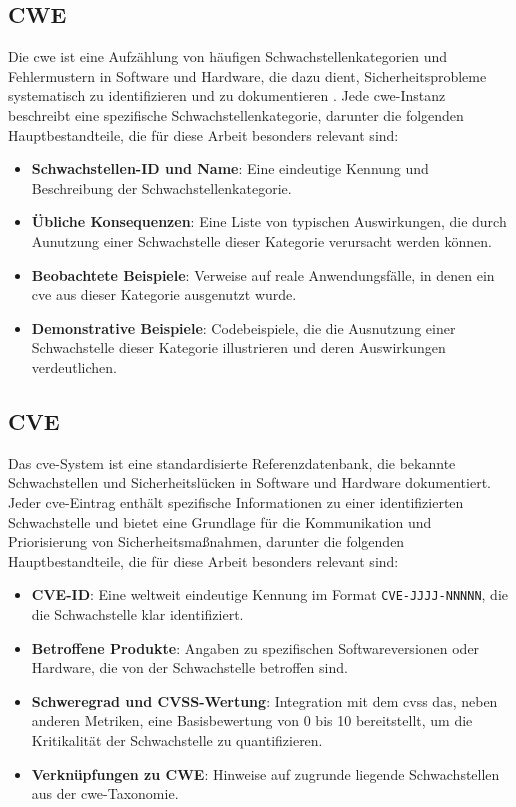 \subsection{CWE}
\label{bg:cwe}
Die \gls{cwe} ist eine Aufzählung von häufigen Schwachstellenkategorien und Fehlermustern in Software und Hardware, die dazu dient, Sicherheitsprobleme systematisch zu identifizieren und zu dokumentieren \autocite{CWEWebsite}. Jede \gls{cwe}-Instanz beschreibt eine spezifische Schwachstellenkategorie, darunter die folgenden Hauptbestandteile, die für diese Arbeit besonders relevant sind:

\begin{itemize}
    \item \textbf{Schwachstellen-ID und Name}: Eine eindeutige Kennung und Beschreibung der Schwachstellenkategorie.
    \item \textbf{Übliche Konsequenzen}: Eine Liste von typischen Auswirkungen, die durch Aunutzung einer Schwachstelle dieser Kategorie verursacht werden können.
    \item \textbf{Beobachtete Beispiele}: Verweise auf reale Anwendungsfälle, in denen ein \gls{cve} aus dieser Kategorie ausgenutzt wurde.
    \item \textbf{Demonstrative Beispiele}: Codebeispiele, die die Ausnutzung einer Schwachstelle dieser Kategorie illustrieren und deren Auswirkungen verdeutlichen.
\end{itemize}

\subsection{CVE}
\label{bg:cve}
Das \gls{cve}-System ist eine standardisierte Referenzdatenbank, die bekannte Schwachstellen und Sicherheitslücken in Software und Hardware dokumentiert. Jeder \gls{cve}-Eintrag enthält spezifische Informationen zu einer identifizierten Schwachstelle und bietet eine Grundlage für die Kommunikation und Priorisierung von Sicherheitsmaßnahmen, darunter die folgenden Hauptbestandteile, die für diese Arbeit besonders relevant sind:

\begin{itemize}
    \item \textbf{CVE-ID}: Eine weltweit eindeutige Kennung im Format \texttt{CVE-JJJJ-NNNNN}, die die Schwachstelle klar identifiziert.
    \item \textbf{Betroffene Produkte}: Angaben zu spezifischen Softwareversionen oder Hardware, die von der Schwachstelle betroffen sind.
    \item \textbf{Schweregrad und CVSS-Wertung}: Integration mit dem \gls{cvss} das, neben anderen Metriken, eine Basisbewertung von 0 bis 10 bereitstellt, um die Kritikalität der Schwachstelle zu quantifizieren.
    \item \textbf{Verknüpfungen zu CWE}: Hinweise auf zugrunde liegende Schwachstellen aus der \gls{cwe}-Taxonomie.
\end{itemize}

